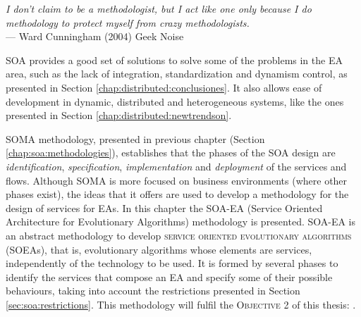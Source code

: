 \label{chap:soaea}


\begin{flushright}{\slshape
    I don't claim to be a methodologist, but I act like one only because
     I do methodology to protect myself from crazy methodologists. } \\ \medskip
    --- {Ward Cunningham (2004) Geek Noise}
\end{flushright}

\minitoc\mtcskip
\vfill
\lettrine{S}{OA} provides a good set of solutions to solve some of the
problems in the EA area, such as the lack of integration,
standardization and dynamism control, as presented in Section \ref{chap:distributed:conclusiones}. It also allows ease of
development in dynamic, distributed and heterogeneous systems, like the ones presented in Section \ref{chap:distributed:newtrendson}. %


SOMA methodology, presented in previous chapter (Section \ref{chap:soa:methodologies}), establishes that the phases of the SOA design are {\em identification}, {\em specification}, {\em implementation} and {\em deployment} of the services and flows. Although SOMA is more focused on business environments (where other phases exist), the ideas that it offers are used to develop a methodology for the design of services for EAs. In this chapter the \textsc{SOA-EA} (Service Oriented Architecture for Evolutionary Algorithms) methodology is presented. SOA-EA is an abstract methodology to develop \textsc{service oriented evolutionary algorithms} (SOEAs), that is, evolutionary algorithms whose elements are services, independently of the technology to be used. It is formed by several phases to identify the services that compose an EA and specify some of their possible behaviours, taking into account the restrictions presented in Section \ref{sec:soa:restrictions}. This methodology will fulfil the \textsc{Objective 2} of this thesis: \objectivemethodology. %

